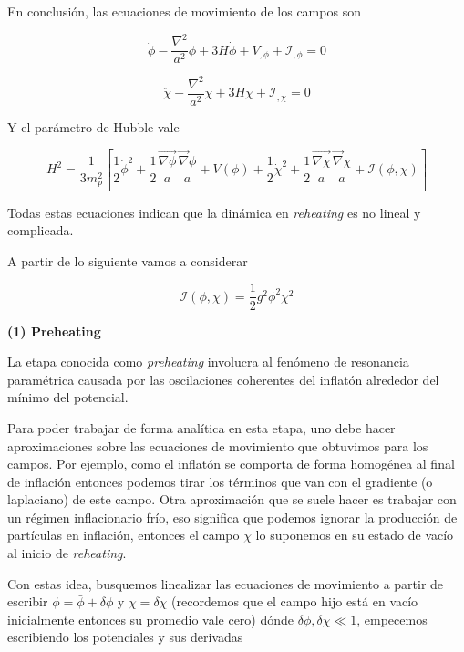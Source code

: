 En conclusión, las ecuaciones de movimiento de los campos son

\begin{equation}
    \ddot{\phi} - \frac{\nabla^2}{a^2} \phi + 3 H \dot{\phi} + V_{,\phi} + \mathcal{I}_{,\phi} = 0
\end{equation}

\begin{equation}
    \ddot{\chi} - \frac{\nabla^2}{a^2} \chi + 3 H \dot{\chi} + \mathcal{I}_{,\chi} = 0
\end{equation}

Y el parámetro de Hubble vale

\begin{equation}
    H^2 = \frac{1}{3 m^2_p} \left[ \frac{1}{2} \dot{\phi}^2 + \frac{1}{2} \frac{\vec{\nabla \phi}}{a} \frac{\vec{\nabla} \phi}{a} + V(\phi) + \frac{1}{2} \dot{\chi}^2 + \frac{1}{2} \frac{\vec{\nabla \chi}}{a} \frac{\vec{\nabla} \chi}{a} + \mathcal{I}(\phi, \chi)  \right]
\end{equation}

\noindent
Todas estas ecuaciones indican que la dinámica en \textit{reheating} es no lineal y complicada.

A partir de lo siguiente vamos a considerar

\begin{equation}
    \mathcal{I} (\phi, \chi) = \frac{1}{2} g^2 \phi^2 \chi^2
\end{equation}

\noindent
\textbf{(1) Preheating}

La etapa conocida como \textit{preheating} involucra al fenómeno de resonancia paramétrica causada por las oscilaciones coherentes del inflatón alrededor del mínimo del potencial. 

Para poder trabajar de forma analítica en esta etapa, uno debe hacer aproximaciones sobre las ecuaciones de movimiento que obtuvimos para los campos. Por ejemplo, como el inflatón se comporta de forma homogénea al final de inflación entonces podemos tirar los términos que van con el gradiente (o laplaciano) de este campo. Otra aproximación que se suele hacer es trabajar con un régimen inflacionario frío, eso significa que podemos ignorar la producción de partículas en inflación, entonces el campo $\chi$ lo suponemos en su estado de vacío al inicio de \textit{reheating}. 


Con estas idea, busquemos linealizar las ecuaciones de movimiento a partir de escribir $\phi = \bar{\phi} + \delta \phi$ y $\chi = \delta \chi$ (recordemos que el campo hijo está en vacío inicialmente entonces su promedio vale cero) dónde $\delta \phi, \delta \chi \ll 1$, empecemos escribiendo los potenciales y sus derivadas

